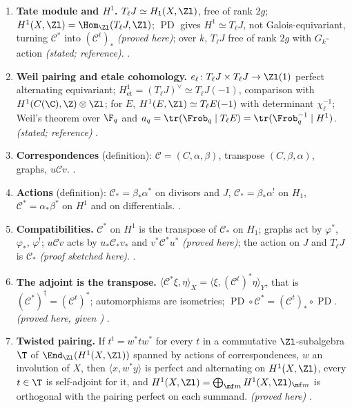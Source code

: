 \begin{enumerate}[label=\textbf{\thechapter.\arabic*}]
\item \textbf{Tate module and $H^1$.} $T_\ell J\simeq H_1(X,\Zl)$, free of rank $2g$; $H^1(X,\Zl)=\Hom_{\Zl}(T_\ell J,\Zl)$; $\operatorname{PD}$ gives $H^1\simeq T_\ell J$, not Galois-equivariant, turning $\mathcal C^*$
into $(\mathcal C^t)_*$ \emph{(proved here)}; over $k$, $T_\ell J$ free of rank $2g$ with $G_k$-action \emph{(stated; reference)}. .
\item \textbf{Weil pairing and etale cohomology.} $e_\ell\colon T_\ell J\times T_\ell J\to\Zl(1)$ perfect alternating equivariant; $H^1_{\mathrm{et}}=(T_\ell J)^\vee\simeq T_\ell J(-1)$, comparison with
$H^1(C(\C),\Z)\otimes\Zl$; for $E$, $H^1(E,\Zl)\simeq T_\ell E(-1)$ with determinant $\chi_\ell^{-1}$; Weil's theorem over $\F_q$ and $a_q=\tr(\Frob_q\mid T_\ell E)=\tr(\Frob_q^{-1}\mid H^1)$. \emph{(stated;
reference)} .
\item \textbf{Correspondences} (definition): $\mathcal C=(C,\alpha,\beta)$, transpose $(C,\beta,\alpha)$, graphs, $u\mathcal Cv$. .
\item \textbf{Actions} (definition): $\mathcal C_*=\beta_*\alpha^*$ on divisors and $J$, $\mathcal C_*=\beta_*\alpha^!$ on $H_1$, $\mathcal C^*=\alpha_*\beta^*$ on $H^1$ and on differentials.
.
\item \textbf{Compatibilities.} $\mathcal C^*$ on $H^1$ is the transpose of $\mathcal C_*$ on $H_1$; graphs act by $\varphi^*$, $\varphi_*$, $\varphi^!$; $u\mathcal Cv$ acts by $u_*\mathcal C_*v_*$ and
$v^*\mathcal C^*u^*$ \emph{(proved here)}; the action on $J$ and $T_\ell J$ is $\mathcal C_*$ \emph{(proof sketched here)}. .
\item \textbf{The adjoint is the transpose.} $\langle\mathcal C^*\xi,\eta\rangle_X=\langle\xi,(\mathcal C^t)^*\eta\rangle_Y$, that is $(\mathcal C^*)^\dagger=(\mathcal C^t)^*$; automorphisms are isometries;
$\operatorname{PD}\circ\mathcal C^*=(\mathcal C^t)_*\circ\operatorname{PD}$. \emph{(proved here, given )} .
\item \textbf{Twisted pairing.} If $t^t=w^*tw^*$ for every $t$ in a commutative $\Zl$-subalgebra $\T$ of $\End_{\Zl}(H^1(X,\Zl))$ spanned by actions of correspondences, $w$ an involution of $X$, then $\langle x,w^*y\rangle$ is perfect and alternating
on $H^1(X,\Zl)$, every $t\in\T$ is self-adjoint for it, and $H^1(X,\Zl)=\bigoplus_{\mf m}H^1(X,\Zl)_{\mf m}$ is orthogonal with the pairing perfect on each summand. \emph{(proved here)}
.
\end{enumerate}

